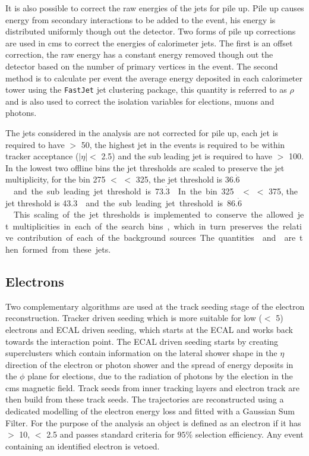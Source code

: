 It is also possible to correct the raw energies of the jets for pile up. Pile 
up causes energy from secondary interactions to be added to the event, his 
energy is distributed uniformly though out the detector. Two forms of pile up 
corrections are used in \ac{cms} to correct the energies of calorimeter jets. 
The first is an offset correction, the raw energy has a constant energy removed 
though out the detector based on the number of primary vertices in the event. 
The second method is to calculate per event the average energy deposited in 
each calorimeter tower using the 
\texttt{FastJet}\cite{Cacciari:2011ma,hep-ph/0512210} jet clustering package, 
this quantity is referred to as $\rho$ and is also used to correct the 
isolation variables for elections, muons and photons.


The jets considered in the analysis are not corrected for pile up, each jet is 
required to have \ET $>$ \unit{50}{\GeV}, the highest \ET jet in the events is 
required to be within tracker acceptance ($|\eta| <$ 2.5) and the sub leading 
jet is required to have \ET $>$ \unit{100}{\GeV}. In the lowest two offline \HT 
bins the jet thresholds are scaled to preserve the jet multiplicity, for the 
bin \unit{275}{\GeV} $<$ \HT $<$ \unit{325}{\GeV}, the jet threshold is 
\unit{36.$\dot{6}$}{\GeV} and the sub leading jet threshold is 
\unit{73.$\dot{3}$}{\GeV}. In the bin \unit{325}{\GeV} $<$ \HT $<$ 
\unit{375}{\GeV}, the jet threshold is \unit{43.$\dot{3}$}{\GeV} and the sub 
leading jet threshold is \unit{86.$\dot{6}$}{\GeV}. This scaling of the jet 
thresholds is implemented to conserve the allowed jet multiplicities in each of 
the search bins, which in turn preserves the relative contribution of each of 
the background sources.

The quantities \HT and \HTm are then formed from these jets.

\subsection{Electrons} %
\label{sub:electrons}
Two complementary algorithms are used at the track seeding stage of the 
electron reconstruction. Tracker driven seeding which is more suitable for low 
\PT (\PT $<$ \unit{5}{\GeV}) electrons and ECAL driven seeding, which starts at 
the ECAL and works back towards the interaction point. The ECAL driven seeding 
starts by creating superclusters\cite{0954-3899-34-6-S01} which contain 
information on the lateral shower shape in the $\eta$ direction of the electron 
or photon shower and the spread of energy deposits in the $\phi$ plane for 
elections, due to the radiation of photons by the election in the \ac{cms} 
magnetic field. Track seeds from inner tracking layers and electron track are 
then build from these track seeds. The trajectories are reconstructed using a 
dedicated modelling of the electron energy loss and fitted with a Gaussian Sum 
Filter\cite{0954-3899-31-9-N01}.
For the purpose of the analysis an object is defined as an electron if it has 
\PT $>$ \unit{10}{\GeV}, \mETA $<$ 2.5 and passes standard criteria for $95\%$ selection efficiency\cite{PAS-EGM-10-004}. Any event containing an identified 
electron is vetoed. 

